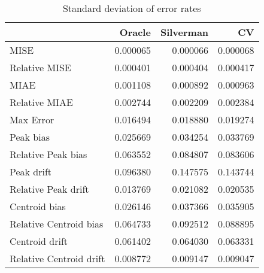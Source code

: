 \begin{table}[H]
\centering
\begin{tabular}{lrrr}
  \hline
 & Oracle & Silverman & CV \\ 
  \hline
MISE & 0.000065 & 0.000066 & 0.000068 \\ 
  Relative MISE & 0.000401 & 0.000404 & 0.000417 \\ 
  MIAE & 0.001108 & 0.000892 & 0.000963 \\ 
  Relative MIAE & 0.002744 & 0.002209 & 0.002384 \\ 
  Max Error & 0.016494 & 0.018880 & 0.019274 \\ 
  Peak bias & 0.025669 & 0.034254 & 0.033769 \\ 
  Relative Peak bias & 0.063552 & 0.084807 & 0.083606 \\ 
  Peak drift & 0.096380 & 0.147575 & 0.143744 \\ 
  Relative Peak drift & 0.013769 & 0.021082 & 0.020535 \\ 
  Centroid bias & 0.026146 & 0.037366 & 0.035905 \\ 
  Relative Centroid bias & 0.064733 & 0.092512 & 0.088895 \\ 
  Centroid drift & 0.061402 & 0.064030 & 0.063331 \\ 
  Relative Centroid drift & 0.008772 & 0.009147 & 0.009047 \\ 
   \hline
\end{tabular}
\caption{Standard deviation of error rates} 
\label{tbl:stddev_error_rates}
\end{table}
